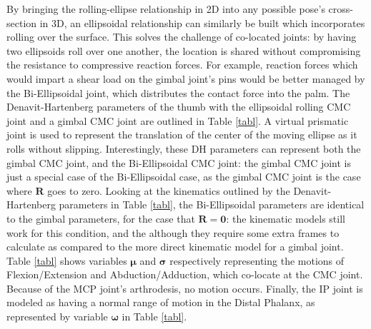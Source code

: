 \documentclass[journal]{IEEEtran}
\begin{document}
By bringing the rolling-ellipse relationship in 2D into any possible pose's cross-section in 3D, an ellipsoidal relationship can similarly be built which incorporates rolling over the surface. This solves the challenge of co-located joints: by having two ellipsoids roll over one another, the location is shared without compromising the resistance to compressive reaction forces. For example, reaction forces which would impart a shear load on the gimbal joint's pins would be better managed by the Bi-Ellipsoidal joint, which distributes the contact force into the palm. The Denavit-Hartenberg parameters of the thumb with the ellipsoidal rolling CMC joint and a gimbal CMC joint are outlined in Table \ref{tabl}. A virtual prismatic joint is used to represent the translation of the center of the moving ellipse as it rolls without slipping. Interestingly, these DH parameters can represent both the gimbal CMC joint, and the Bi-Ellipsoidal CMC joint: the gimbal CMC joint is just a special case of the Bi-Ellipsoidal case, as the gimbal CMC joint is the case where $\mathbf{R}$ goes to zero. Looking at the kinematics outlined by the Denavit-Hartenberg parameters in Table \ref{tabl}, the Bi-Ellipsoidal parameters are identical to the gimbal parameters, for the case that $\mathbf{R = 0}$: the kinematic models still work for this condition, and the although they require some extra frames to calculate as compared to the more direct kinematic model for a gimbal joint. Table \ref{tabl} shows variables $\mathbf{\mu}$ and $\mathbf{\sigma}$ respectively representing the motions of Flexion/Extension and Abduction/Adduction, which co-locate at the CMC joint. Because of the MCP joint's arthrodesis, no motion occurs. Finally, the IP joint is modeled as having a normal range of motion in the Distal Phalanx, as represented by variable $\mathbf{\omega}$ in Table \ref{tabl}.
\end{document}
